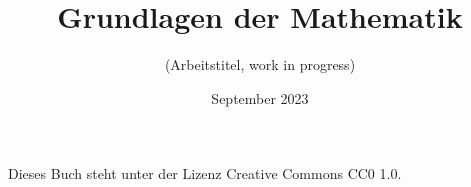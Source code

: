 \documentclass[paper=186mm:234mm,pagesize=auto,fleqn,11pt,dvipdfmx]{scrbook}
\title{Grundlagen der Mathematik}
\subtitle{(Arbeitstitel, work in progress)}
\date{September 2023}
\theoremstyle{rmbox}
\numberwithin{Definition}{chapter}
\numberwithin{Satz}{chapter}
\begin{document}
\thispagestyle{empty}

\maketitle

\noindent
Dieses Buch steht unter der Lizenz Creative Commons CC0 1.0.

\tableofcontents









\printindex
\end{document}
